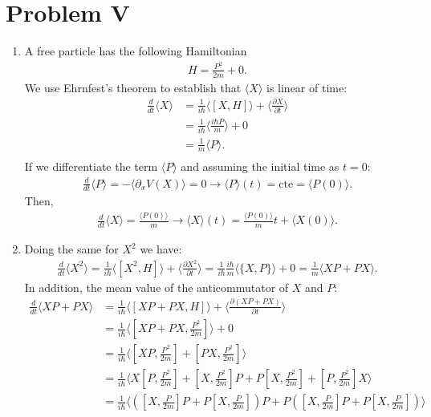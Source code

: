 \documentclass[letterpaper,11pt,twoside]{article}
\newcommand{\braket}[1]{\langle#1\rangle}
\begin{document}
\section*{Problem V}
\begin{enumerate}[itemsep=0pt,topsep=0pt,label=\alph*.]
  \item A free particle has the following Hamiltonian
  \begin{align*}
    H=\frac{P^2}{2m}+0.
  \end{align*}
  We use Ehrnfest's theorem to establish that $\braket{X}$ is linear of time:
  \begin{align*}
    \frac{d}{dt}\braket{X}&=\frac{1}{i\hbar}\braket{[X,H]}+\braket{\frac{\partial X}{\partial t}}\\
    &=\frac{1}{i\hbar}\braket{\frac{i\hbar P}{m}}+0\\
    &=\frac{1}{m}\braket{P}.\\
  \end{align*}
  If we differentiate the term $\braket{P}$ and assuming the initial time as $t=0$:
  \begin{align*}
    \frac{d}{dt}\braket{P}=-\braket{\partial_xV(X)}=0\longrightarrow\braket{P}(t)=\text{cte}=\braket{P(0)}.
  \end{align*}
  Then,
  \begin{align*}
    \frac{d}{dt}\braket{X}=\frac{\braket{P(0)}}{m}\longrightarrow \braket{X}(t)=\frac{\braket{P(0)}}{m}t+\braket{X(0)}.
  \end{align*}
  \item Doing the same for $X^2$ we have:
  \begin{align*}
    \frac{d}{dt}\braket{X^2}=\frac{1}{i\hbar}\braket{[X^2,H]}+\braket{\frac{\partial X^2}{\partial t}}=\frac{1}{i\hbar}\frac{i\hbar}{m}\braket{\{X,P\}}+0=\frac{1}{m}\braket{XP+PX}.
  \end{align*}
  In addition, the mean value of the anticommutator of $X$ and $P$:
  {\small
  \begin{align*}
    \frac{d}{dt}\braket{XP+PX}&=\frac{1}{i\hbar}\braket{[XP+PX,H]}+\braket{\frac{\partial(XP+PX)}{\partial t}}\\
    &=\frac{1}{i\hbar}\braket{[XP+PX,\frac{P^2}{2m}]}+0\\
    &=\frac{1}{i\hbar}\braket{[XP,\frac{P^2}{2m}]+[PX,\frac{P^2}{2m}]}\\
    &=\frac{1}{i\hbar}\braket{X[P,\frac{P^2}{2m}]+[X,\frac{P^2}{2m}]P+P[X,\frac{P^2}{2m}]+[P,\frac{P^2}{2m}]X}\\
    &=\frac{1}{i\hbar}\braket{\left([X,\frac{P}{2m}]P+P[X,\frac{P}{2m}]\right)P+P\left([X,\frac{P}{2m}]P+P[X,\frac{P}{2m}]\right)}\\

\end{align*}}
\end{enumerate}
\end{document}
